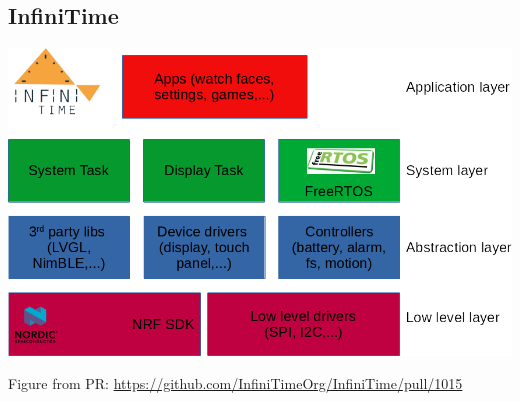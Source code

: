 \documentclass{beamer}
\begin{document}
\subsection{InfiniTime}
\begin{frame}{}
  \includegraphics[width=\textwidth]{../architecture_infinitime}

  \small Figure from PR: 
  \href{https://github.com/InfiniTimeOrg/InfiniTime/pull/1015}{https://github.com/InfiniTimeOrg/InfiniTime/pull/1015}{}
\end{frame}
\end{document}
